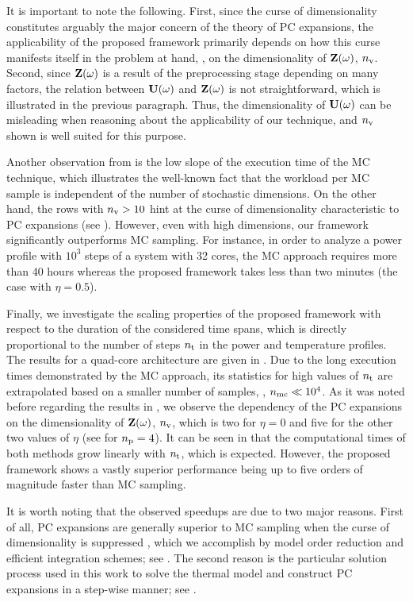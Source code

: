 It is important to note the following.
First, since the curse of dimensionality constitutes arguably the major concern of the theory of PC expansions, the applicability of the proposed framework primarily depends on how this curse manifests itself in the problem at hand, \ie, on the dimensionality of $\mathbf{Z}(\omega)$, ${n_\text{v}}$.
Second, since $\mathbf{Z}(\omega)$ is a result of the preprocessing stage depending on many factors, the relation between $\mathbf{U}(\omega)$ and $\mathbf{Z}(\omega)$ is not straightforward, which is illustrated in the previous paragraph.
Thus, the dimensionality of $\mathbf{U}(\omega)$ can be misleading when reasoning about the applicability of our technique, and ${n_\text{v}}$ shown  is well suited for this purpose.

Another observation from  is the low slope of the execution time of the MC technique, which illustrates the well-known fact that the workload per MC sample is independent of the number of stochastic dimensions.
On the other hand, the rows with ${n_\text{v}} > 10$ hint at the curse of dimensionality characteristic to PC expansions (see ).
However, even with high dimensions, our framework significantly outperforms MC sampling. For instance, in order to analyze a power profile with $10^3$ steps of a system with 32 cores, the MC approach requires more than 40 hours whereas the proposed framework takes less than two minutes (the case with $\eta = 0.5$).

Finally, we investigate the scaling properties of the proposed framework with respect to the duration of the considered time spans, which is directly proportional to the number of steps ${n_\text{t}}$ in the power and temperature profiles.
The results for a quad-core architecture are given in .
Due to the long execution times demonstrated by the MC approach, its statistics for high values of ${n_\text{t}}$ are extrapolated based on a smaller number of samples, \ie, ${n_\text{mc}} \ll 10^4$.
As it was noted before regarding the results in , we observe the dependency of the PC expansions on the dimensionality of $\mathbf{Z}(\omega)$, ${n_\text{v}}$, which is two for $\eta = 0$ and five for the other two values of $\eta$ (see  for ${n_\text{p}} = 4$).
It can be seen in  that the computational times of both methods grow linearly with ${n_\text{t}}$, which is expected.
However, the proposed framework shows a vastly superior performance being up to five orders of magnitude faster than MC sampling.

It is worth noting that the observed speedups are due to two major reasons.
First of all, PC expansions are generally superior to MC sampling when the curse of dimensionality is suppressed \cite{xiu2010, eldred2008}, which we accomplish by model order reduction and efficient integration schemes; see .
The second reason is the particular solution process used in this work to solve the thermal model and construct PC expansions in a step-wise manner; see .
